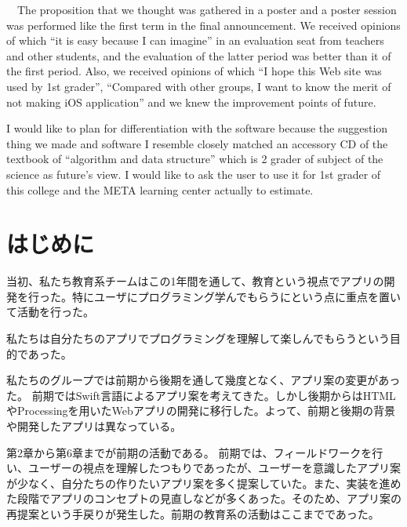 \documentclass[openany,11pt,papersize]{jsbook}
\begin{document}
\begin{eabstract}
　The proposition that we thought was gathered in a poster and a poster session was performed like the first term in the final announcement. We received opinions of which ``it is easy because I can imagine'' in an evaluation seat from teachers and other students, and the evaluation of the latter period was better than it of the first period. Also, we received opinions of which ``I hope this Web site was used by 1st grader'', ``Compared with other groups, I want to know the merit of not making iOS application'' and we knew the improvement points of future.

I would like to plan for differentiation with the software because the suggestion thing we made and software I resemble closely matched an accessory CD of the textbook of ``algorithm and data structure'' which is 2 grader of subject of the science as future's view. I would like to ask the user to use it for 1st grader of this college and the META learning center actually to estimate.
\end{eabstract}

\tableofcontents%


\mainmatter%

\chapter{はじめに}
当初、私たち教育系チームはこの1年間を通して、教育という視点でアプリの開発を行った。特にユーザにプログラミング学んでもらうにという点に重点を置いて活動を行った。

私たちは自分たちのアプリでプログラミングを理解して楽しんでもらうという目的であった。

私たちのグループでは前期から後期を通して幾度となく、アプリ案の変更があった。
前期ではSwift言語によるアプリ案を考えてきた。しかし後期からはHTMLやProcessingを用いたWebアプリの開発に移行した。よって、前期と後期の背景や開発したアプリは異なっている。

第2章から第6章までが前期の活動である。
前期では、フィールドワークを行い、ユーザーの視点を理解したつもりであったが、ユーザーを意識したアプリ案が少なく、自分たちの作りたいアプリ案を多く提案していた。また、実装を進めた段階でアプリのコンセプトの見直しなどが多くあった。そのため、アプリ案の再提案という手戻りが発生した。前期の教育系の活動はここまでであった。
\end{document}
